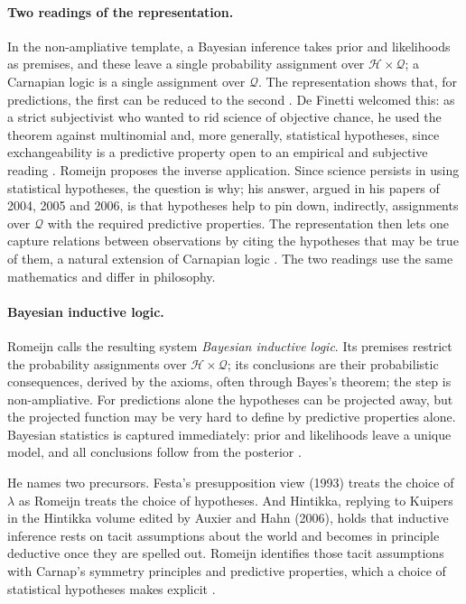 \paragraph{Two readings of the representation.}
In the non-ampliative template, a Bayesian inference takes prior and
likelihoods as premises, and these leave a single probability
assignment over \(\mathcal H\times\mathcal Q\); a Carnapian logic is a
single assignment over \(\mathcal Q\). The representation shows that,
for predictions, the first can be reduced to the second
\cite[p.~636]{Romeijn2011InductiveLogicStatistics}. De Finetti welcomed
this: as a strict subjectivist who wanted to rid science of objective
chance, he used the theorem against multinomial and, more generally,
statistical hypotheses, since exchangeability is a predictive property
open to an empirical and subjective reading
\cite[p.~636]{Romeijn2011InductiveLogicStatistics}. Romeijn proposes
the inverse application. Since science persists in using statistical
hypotheses, the question is why; his answer, argued in his papers of
2004, 2005 and 2006, is that hypotheses help to pin down, indirectly,
assignments over \(\mathcal Q\) with the required predictive
properties. The representation then lets one capture relations between
observations by citing the hypotheses that may be true of them, a
natural extension of Carnapian logic
\cite[p.~636]{Romeijn2011InductiveLogicStatistics}. The two readings
use the same mathematics and differ in philosophy.

\paragraph{Bayesian inductive logic.}
Romeijn calls the resulting system \emph{Bayesian inductive logic}.
Its premises restrict the probability assignments over
\(\mathcal H\times\mathcal Q\); its conclusions are their probabilistic
consequences, derived by the axioms, often through Bayes's theorem; the
step is non-ampliative. For predictions alone the hypotheses can be
projected away, but the projected function may be very hard to define
by predictive properties alone. Bayesian statistics is captured
immediately: prior and likelihoods leave a unique model, and all
conclusions follow from the posterior
\cite[pp.~636--637]{Romeijn2011InductiveLogicStatistics}.

He names two precursors. Festa's presupposition view (1993) treats the
choice of \(\lambda\) as Romeijn treats the choice of hypotheses. And
Hintikka, replying to Kuipers in the Hintikka volume edited by Auxier
and Hahn (2006), holds that inductive inference rests on tacit
assumptions about the world and becomes in principle deductive once
they are spelled out. Romeijn identifies those tacit assumptions with
Carnap's symmetry principles and predictive properties, which a choice
of statistical hypotheses makes explicit
\cite[p.~637]{Romeijn2011InductiveLogicStatistics}.


